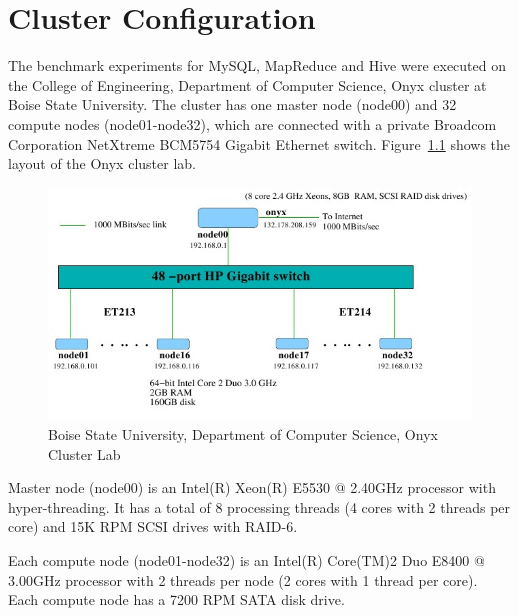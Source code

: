 %
%
\chapter{Cluster Configuration} \label{app:cluster-config}
The benchmark experiments for MySQL, MapReduce and Hive were executed on the
College of Engineering, Department of Computer Science, Onyx cluster at Boise
State University. The cluster has one master node (node00) and 32 compute nodes (node01-node32), 
which are connected with a private Broadcom Corporation NetXtreme BCM5754 Gigabit
Ethernet switch. Figure~\ref{fig:linux-cluster} shows the layout of the Onyx cluster lab.

\begin{figure}[h!]
 \centering
 \includegraphics[bb=0 0 477 262]{../images/linux-cluster-lab.jpg}
 \caption{Boise State University, Department of Computer Science, Onyx Cluster Lab}
\label{fig:linux-cluster}
\end{figure}

Master node (node00) is an Intel(R) Xeon(R) E5530 @ 2.40GHz processor with
hyper-threading. It has a total of 8 processing threads (4 cores with 2 threads
per core) and 15K RPM SCSI drives with RAID-6.

Each compute node (node01-node32) is an Intel(R) Core(TM)2 Duo E8400 @ 3.00GHz
processor with 2 threads per node (2 cores with 1 thread per core). Each
compute node has a 7200 RPM SATA disk drive.